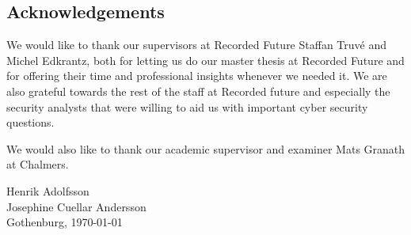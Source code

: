 
\noindent
\begin{comment}
\thesistitle\\
\thesissubtitle\\
\whatthisis\\
\\
\large{%
    Henrik Adolfsson\\
	Josephine Cuellar Andersson\\
}\\
\\
\large{%
	\whereandwhen
}
\vfill
\end{comment}

\begin{center}
    \section*{Acknowledgements}
\end{center}
We would like to thank our supervisors at Recorded Future Staffan Truvé and Michel Edkrantz, both for letting us do our master thesis at Recorded Future and for offering their time and professional insights whenever we needed it. We are also grateful towards the rest of the staff at Recorded future and especially the security analysts that were willing to aid us with important cyber security questions.

We would also like to thank our academic supervisor and examiner Mats Granath at Chalmers.
\\[1cm]
\begin{flushright} 
Henrik  Adolfsson\\
Josephine Cuellar Andersson\\
Gothenburg, \today
\end{flushright}
